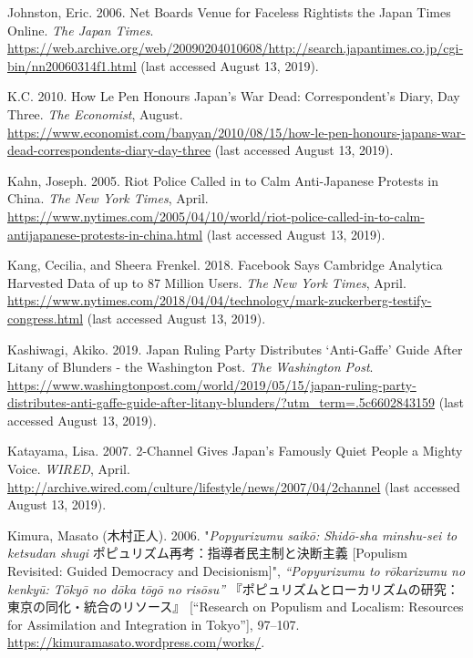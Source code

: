 \documentclass[10pt,british,A4paper,twoside]{memoir}
\begin{document}
\hypertarget{ref-johnston_net_2006}{}
Johnston, Eric. 2006. Net Boards Venue for Faceless Rightists the Japan
Times Online. \emph{The Japan Times}.
\url{https://web.archive.org/web/20090204010608/http://search.japantimes.co.jp/cgi-bin/nn20060314f1.html} (last accessed August 13, 2019).

\hypertarget{ref-k.c._how_2010}{}
K.C. 2010. How Le Pen Honours Japan's War Dead: Correspondent's Diary,
Day Three. \emph{The Economist}, August.
\url{https://www.economist.com/banyan/2010/08/15/how-le-pen-honours-japans-war-dead-correspondents-diary-day-three} (last accessed August 13, 2019).

\hypertarget{ref-kahn_riot_2005}{}
Kahn, Joseph. 2005. Riot Police Called in to Calm Anti-Japanese Protests
in China. \emph{The New York Times}, April.
\url{https://www.nytimes.com/2005/04/10/world/riot-police-called-in-to-calm-antijapanese-protests-in-china.html} (last accessed August 13, 2019).

\hypertarget{ref-kang_facebook_2018}{}
Kang, Cecilia, and Sheera Frenkel. 2018. Facebook Says Cambridge
Analytica Harvested Data of up to 87 Million Users. \emph{The New York
Times}, April.
\url{https://www.nytimes.com/2018/04/04/technology/mark-zuckerberg-testify-congress.html} (last accessed August 13, 2019).

\hypertarget{ref-kashiwagi_japan_2019}{}
Kashiwagi, Akiko. 2019. Japan Ruling Party Distributes `Anti-Gaffe'
Guide After Litany of Blunders - the Washington Post. \emph{The
Washington Post}.
\url{https://www.washingtonpost.com/world/2019/05/15/japan-ruling-party-distributes-anti-gaffe-guide-after-litany-blunders/?utm_term=.5c6602843159} (last accessed August 13, 2019).

\hypertarget{ref-katayama_2-channel_2007}{}
Katayama, Lisa. 2007. 2-Channel Gives Japan's Famously Quiet People a
Mighty Voice. \emph{WIRED}, April.
\url{http://archive.wired.com/culture/lifestyle/news/2007/04/2channel} (last accessed August 13, 2019).

\hypertarget{ref-kimura__2006}{}
Kimura, Masato (木村正人). 2006. "\emph{Popyurizumu saikō: Shidō-sha minshu-sei to ketsudan shugi} ポピュリズム再考：指導者民主制と決断主義 [Populism Revisited: Guided Democracy and Decisionism]",
\emph{“Popyurizumu to rōkarizumu no kenkyū: Tōkyō no dōka tōgō no risōsu”} 『ポピュリズムとローカリズムの研究：東京の同化・統合のリソース』 [“Research on Populism and Localism: Resources for Assimilation and Integration in Tokyo”], 97--107. \url{https://kimuramasato.wordpress.com/works/}.
\end{document}
